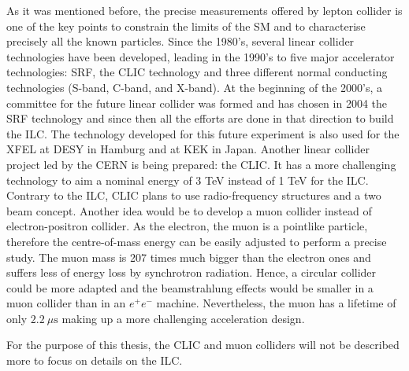     As it was mentioned before, the precise measurements offered by lepton collider is one of the key points to constrain the limits of the \gls{SM} and to characterise precisely all the known particles.
    Since the 1980's, several linear collider technologies have been developed, leading in the 1990's to five major accelerator technologies: \gls{SRF}, the \gls{CLIC} technology and three different normal conducting technologies (S-band, C-band, and X-band)\cite{Desy1988}.
    At the beginning of the 2000's, a committee for the future linear collider was formed and has chosen in 2004 the \gls{SRF} technology\cite{ICFA2004} and since then all the efforts are done in that direction to build the \gls{ILC}.
    The technology developed for this future experiment is also used for the XFEL at DESY in Hamburg and at KEK in Japan.
    Another linear collider project led by the CERN is being prepared: the \gls{CLIC}.
    It has a more challenging technology to aim a nominal energy of 3 TeV instead of 1 TeV for the \gls{ILC}.
    Contrary to the \gls{ILC}, \gls{CLIC} plans to use radio-frequency structures and a two beam concept. 
    Another idea would be to develop a muon collider instead of electron-positron collider\cite{Lipton2012}.
    As the electron, the muon is a pointlike particle, therefore the centre-of-mass energy can be easily adjusted to perform a precise study.
    The muon mass is 207 times much bigger than the electron ones and suffers less of energy loss by synchrotron radiation.
    Hence, a circular collider could be more adapted and the beamstrahlung effects would be smaller in a muon collider than in an $e^+e^-$ machine.
    Nevertheless, the muon has a lifetime of only $2.2 \ \mu\text{s}$ making up a more challenging acceleration design.
    

    For the purpose of this thesis, the \gls{CLIC} and muon colliders will not be described more to focus on details on the \gls{ILC}.
     
